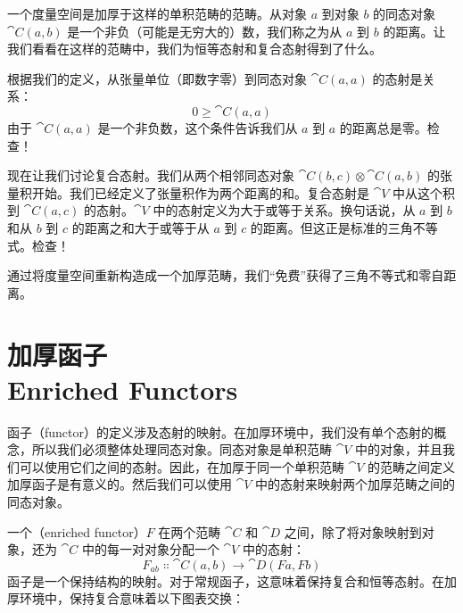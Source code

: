 一个度量空间是加厚于这样的单积范畴的范畴。从对象 $a$ 到对象 $b$ 的同态对象 $\cat{C}(a, b)$ 是一个非负（可能是无穷大的）数，我们称之为从 $a$ 到 $b$ 的距离。让我们看看在这样的范畴中，我们为恒等态射和复合态射得到了什么。

根据我们的定义，从张量单位（即数字零）到同态对象 $\cat{C}(a, a)$ 的态射是关系：
\[0 \geqslant \cat{C}(a, a)\]
由于 $\cat{C}(a, a)$ 是一个非负数，这个条件告诉我们从 $a$ 到 $a$ 的距离总是零。检查！

现在让我们讨论复合态射。我们从两个相邻同态对象 $\cat{C}(b, c) \otimes \cat{C}(a, b)$ 的张量积开始。我们已经定义了张量积作为两个距离的和。复合态射是 $\cat{V}$ 中从这个积到 $\cat{C}(a, c)$ 的态射。$\cat{V}$ 中的态射定义为大于或等于关系。换句话说，从 $a$ 到 $b$ 和从 $b$ 到 $c$ 的距离之和大于或等于从 $a$ 到 $c$ 的距离。但这正是标准的三角不等式。检查！

通过将度量空间重新构造成一个加厚范畴，我们``免费''获得了三角不等式和零自距离。

\section{加厚函子\\ \textmd{Enriched Functors}}

函子（functor）的定义涉及态射的映射。在加厚环境中，我们没有单个态射的概念，所以我们必须整体处理同态对象。同态对象是单积范畴 $\cat{V}$ 中的对象，并且我们可以使用它们之间的态射。因此，在加厚于同一个单积范畴 $\cat{V}$ 的范畴之间定义加厚函子是有意义的。然后我们可以使用 $\cat{V}$ 中的态射来映射两个加厚范畴之间的同态对象。

一个（enriched functor）$F$ 在两个范畴 $\cat{C}$ 和 $\cat{D}$ 之间，除了将对象映射到对象，还为 $\cat{C}$ 中的每一对对象分配一个 $\cat{V}$ 中的态射：
\[F_{a b} \Colon \cat{C}(a, b) \to \cat{D}(F a, F b)\]
函子是一个保持结构的映射。对于常规函子，这意味着保持复合和恒等态射。在加厚环境中，保持复合意味着以下图表交换：

\begin{figure}[H]
  \centering
\end{figure}

